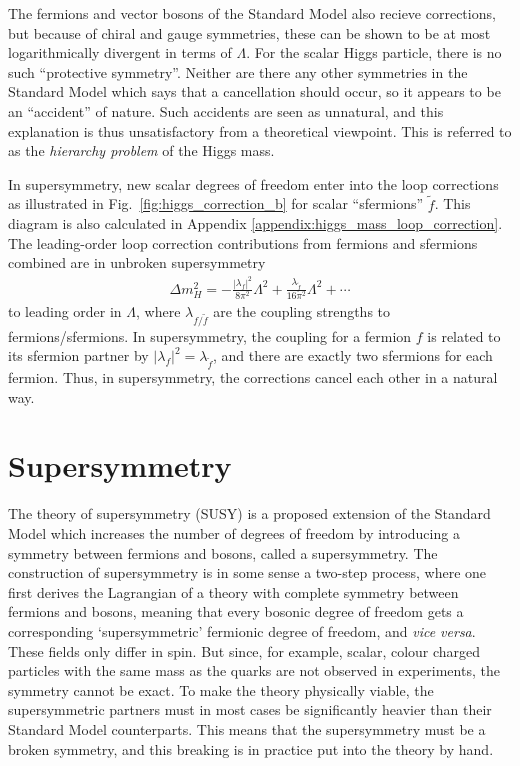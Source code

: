 \documentclass[twoside,english]{uiofysmaster}
\begin{document}
The fermions and vector bosons of the Standard Model also recieve corrections, but because of chiral and gauge symmetries, these can be shown to be at most logarithmically divergent in terms of $\Lambda$. For the scalar Higgs particle, there is no such ``protective symmetry''. Neither are there any other symmetries in the Standard Model which says that a cancellation should occur, so it appears to be an ``accident'' of nature. Such accidents are seen as unnatural, and this explanation is thus unsatisfactory from a theoretical viewpoint. This is referred to as the {\it hierarchy problem} of the Higgs mass. 

In supersymmetry, new scalar degrees of freedom enter into the loop corrections as illustrated in Fig.\ \ref{fig:higgs_correction_b} for scalar ``sfermions'' $\tilde f$. This diagram is also calculated in Appendix \ref{appendix:higgs_mass_loop_correction}. The leading-order loop correction contributions from fermions and sfermions combined are in unbroken supersymmetry
\begin{align}
	\Delta m_H^2 = -\frac{|\lambda_f|^2}{8\pi^2}\Lambda^2 + \frac{\lambda_{\tilde f}}{16\pi^2}\Lambda^2 + \cdots\label{eq:higgs_mass_corrections}
\end{align}
to leading order in $\Lambda$, where $\lambda_{f/\tilde f}$ are the coupling strengths to fermions/sfermions. In supersymmetry, the coupling for a fermion $f$ is related to its sfermion partner by $|\lambda_f|^2 = \lambda_{\tilde f}$, and there are exactly two sfermions for each fermion. Thus, in supersymmetry, the corrections cancel each other in a natural way.






\chapter{Supersymmetry}%
\label{ch:susyintro}
The theory of supersymmetry (SUSY) is a proposed extension of the Standard Model which increases the number of degrees of freedom by introducing a symmetry between fermions and bosons, called a supersymmetry. The construction of supersymmetry is in some sense a two-step process, where one first derives the Lagrangian of a theory with complete symmetry between fermions and bosons, meaning that every bosonic degree of freedom gets a corresponding `supersymmetric' fermionic degree of freedom, and {\it vice versa}. These fields only differ in spin. But since, for example, scalar, colour charged particles with the same mass as the quarks are not observed in experiments, the symmetry cannot be exact. To make the theory physically viable, the supersymmetric partners must in most cases be significantly heavier than their Standard Model counterparts. This means that the supersymmetry must be a broken symmetry, and this breaking is in practice put into the theory by hand.
\end{document}
